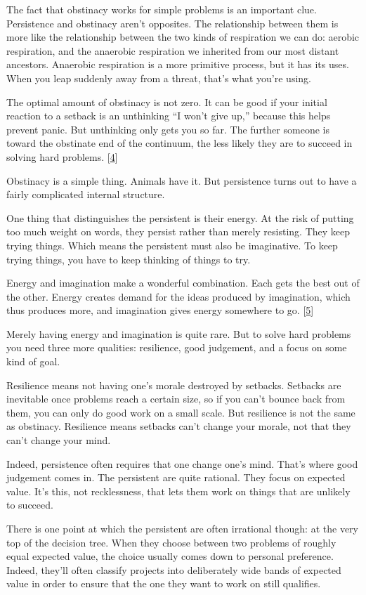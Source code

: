 The fact that obstinacy works for simple problems is an important clue.
Persistence and obstinacy aren't opposites. The relationship between
them is more like the relationship between the two kinds of respiration
we can do: aerobic respiration, and the anaerobic respiration we
inherited from our most distant ancestors. Anaerobic respiration is a
more primitive process, but it has its uses. When you leap suddenly away
from a threat, that's what you're using.

The optimal amount of obstinacy is not zero. It can be good if your
initial reaction to a setback is an unthinking ``I won't give up,''
because this helps prevent panic. But unthinking only gets you so far.
The further someone is toward the obstinate end of the continuum, the
less likely they are to succeed in solving hard problems.
{[}\hyperref[f4n]{4}{]}

Obstinacy is a simple thing. Animals have it. But persistence turns out
to have a fairly complicated internal structure.

One thing that distinguishes the persistent is their energy. At the risk
of putting too much weight on words, they persist rather than merely
resisting. They keep trying things. Which means the persistent must also
be imaginative. To keep trying things, you have to keep thinking of
things to try.

Energy and imagination make a wonderful combination. Each gets the best
out of the other. Energy creates demand for the ideas produced by
imagination, which thus produces more, and imagination gives energy
somewhere to go. {[}\hyperref[f5n]{5}{]}

Merely having energy and imagination is quite rare. But to solve hard
problems you need three more qualities: resilience, good judgement, and
a focus on some kind of goal.

Resilience means not having one's morale destroyed by setbacks. Setbacks
are inevitable once problems reach a certain size, so if you can't
bounce back from them, you can only do good work on a small scale. But
resilience is not the same as obstinacy. Resilience means setbacks can't
change your morale, not that they can't change your mind.

Indeed, persistence often requires that one change one's mind. That's
where good judgement comes in. The persistent are quite rational. They
focus on expected value. It's this, not recklessness, that lets them
work on things that are unlikely to succeed.

There is one point at which the persistent are often irrational though:
at the very top of the decision tree. When they choose between two
problems of roughly equal expected value, the choice usually comes down
to personal preference. Indeed, they'll often classify projects into
deliberately wide bands of expected value in order to ensure that the
one they want to work on still qualifies.

